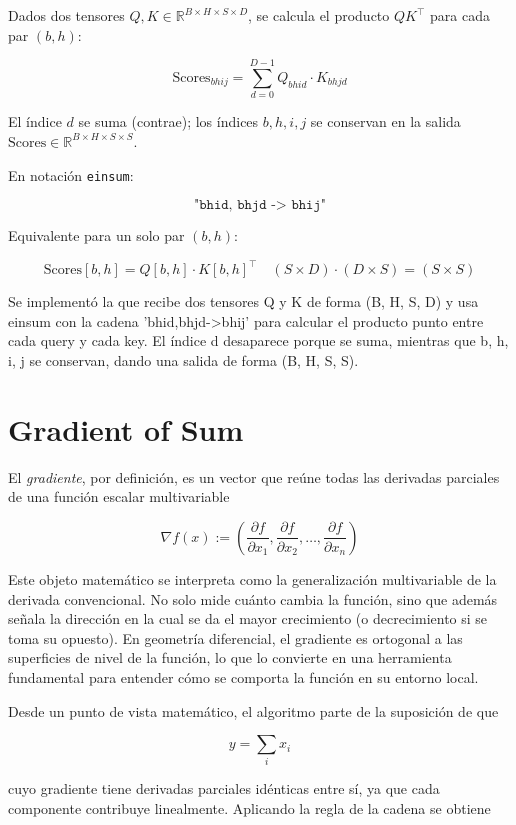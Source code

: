 \documentclass[12pt, letterpaper]{article}
\begin{document}
Dados dos tensores $Q, K \in \mathbb{R}^{B \times H \times S \times D}$, se calcula el producto $QK^\top$ para cada par $(b, h)$:

\[
\text{Scores}_{bhij} = \sum_{d=0}^{D-1} Q_{bhid} \cdot K_{bhjd}
\]

El índice $d$ se suma (contrae); los índices $b, h, i, j$ se conservan en la salida $\text{Scores} \in \mathbb{R}^{B \times H \times S \times S}$.

En notación \texttt{einsum}:

\[
\texttt{"bhid, bhjd -> bhij"}
\]

Equivalente para un solo par $(b, h)$:

\[
\text{Scores}[b,h] = Q[b,h] \cdot K[b,h]^\top \quad (S \times D)\cdot(D \times S) = (S \times S)
\]

Se implementó la que recibe dos tensores Q y K de forma (B, H, S, D) y usa einsum con la cadena 'bhid,bhjd->bhij' para calcular el producto punto entre 
cada query y cada key. El índice d desaparece porque se suma, mientras que b, h, i, j se conservan, dando una salida de forma (B, H, S, S).

\newpage

\section{Gradient of Sum}

El \textit{gradiente}, por definición, es un vector que reúne todas las derivadas parciales de una función escalar multivariable

\[
\nabla f(x) := \left( \frac{\partial f}{\partial x_1}, \frac{\partial f}{\partial x_2}, \dots, \frac{\partial f}{\partial x_n} \right)
\]



Este objeto matemático se interpreta como la generalización multivariable de la derivada convencional. 
No solo mide cuánto cambia la función, sino que además señala la dirección en la cual se da el mayor crecimiento 
(o decrecimiento si se toma su opuesto). En geometría diferencial, el gradiente es ortogonal a las superficies de nivel de la función, 
lo que lo convierte en una herramienta fundamental para entender cómo se comporta la función en su entorno local.

Desde un punto de vista matemático, el algoritmo parte de la suposición de que 

\[
y = \sum_i x_i
\]


cuyo gradiente tiene derivadas parciales idénticas entre sí, ya que cada componente contribuye linealmente. 
Aplicando la regla de la cadena se obtiene
\end{document}
